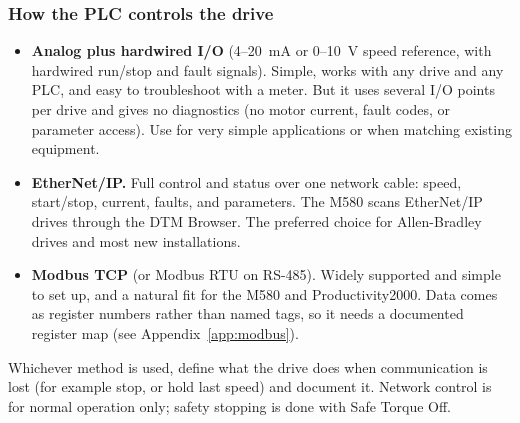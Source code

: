 \subsubsection*{How the PLC controls the drive}
\begin{itemize}[itemsep=2pt]
  \item \textbf{Analog plus hardwired I/O} (4--20~mA or 0--10~V speed reference, with hardwired run/stop and fault signals). Simple, works with any drive and any PLC, and easy to troubleshoot with a meter. But it uses several I/O points per drive and gives no diagnostics (no motor current, fault codes, or parameter access). Use for very simple applications or when matching existing equipment.
  \item \textbf{EtherNet/IP.} Full control and status over one network cable: speed, start/stop, current, faults, and parameters. The M580 scans EtherNet/IP drives through the DTM Browser. The preferred choice for Allen-Bradley drives and most new installations.
  \item \textbf{Modbus TCP} (or Modbus RTU on RS-485). Widely supported and simple to set up, and a natural fit for the M580 and Productivity2000. Data comes as register numbers rather than named tags, so it needs a documented register map (see Appendix~\ref{app:modbus}).
\end{itemize}
Whichever method is used, define what the drive does when communication is lost (for example stop, or hold last speed) and document it. Network control is for normal operation only; safety stopping is done with Safe Torque Off.


